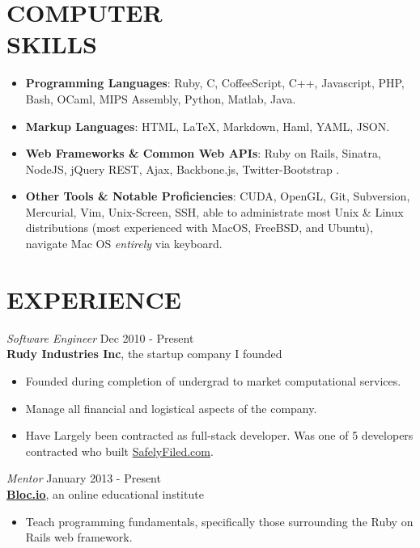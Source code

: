 \documentclass[margin]{res}
\begin{document}
\begin{resume}
\section{COMPUTER \\ SKILLS} 
  \begin{itemize}  
    \small
    \itemsep -2pt %
    \item {\bf Programming Languages}: {\footnotesize Ruby, C, CoffeeScript, C++, 
      Javascript, PHP, Bash, OCaml, MIPS Assembly, Python, Matlab, Java}.
    \item {\bf Markup Languages}: {\footnotesize HTML, \LaTeX, Markdown, Haml, YAML, JSON}.
    \item {\bf Web Frameworks \& Common Web APIs}: {\footnotesize Ruby on Rails, Sinatra, NodeJS, jQuery
      REST, Ajax, Backbone.js, Twitter-Bootstrap} .
    \item {\bf Other Tools \& Notable Proficiencies}: 
      {\footnotesize CUDA, OpenGL, Git, Subversion, Mercurial, Vim, Unix-Screen, 
      SSH, able to administrate most Unix \& Linux distributions 
      (most experienced with MacOS, FreeBSD, and Ubuntu), navigate
      Mac OS \emph{entirely} via keyboard}.
  \end{itemize}

\section{EXPERIENCE} 
  {\sl Software Engineer} \hfill Dec 2010 - Present \\
  {\bf Rudy Industries Inc}, the startup company I founded
  \begin{itemize}  
    \itemsep -2pt %
    \item Founded during completion of undergrad to market computational
      services.
    \item Manage all financial and logistical aspects of the company.
    \item Have Largely been contracted as full-stack developer. Was one of 5 developers contracted who built
      \href{https://safelyfiled.com/home/}{SafelyFiled.com}.
    \end{itemize}
 
  {\sl Mentor} \hfill January 2013 - Present \\
    {\bf \href{https://www.bloc.io/}{Bloc.io}}, an online educational institute 
    \begin{itemize}  
        \item Teach programming fundamentals, specifically those
        surrounding the Ruby on Rails web framework.
     \end{itemize} 
 

\end{resume}
\end{document}
